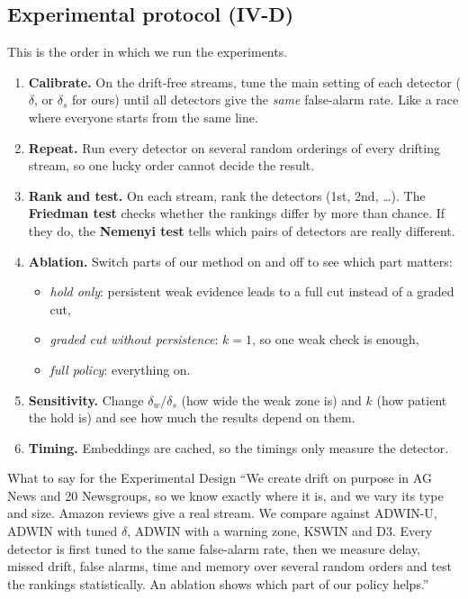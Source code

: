 \documentclass[11pt,a4paper]{article}
\begin{document}
\subsection{Experimental protocol (IV-D)}

This is the order in which we run the experiments.
\begin{enumerate}
\item \textbf{Calibrate.} On the drift-free streams, tune the main setting of each detector ($\delta$, or $\delta_s$ for ours) until all detectors give the \emph{same} false-alarm rate. Like a race where everyone starts from the same line.
\item \textbf{Repeat.} Run every detector on several random orderings of every drifting stream, so one lucky order cannot decide the result.
\item \textbf{Rank and test.} On each stream, rank the detectors (1st, 2nd, \dots). The \textbf{Friedman test} checks whether the rankings differ by more than chance. If they do, the \textbf{Nemenyi test} tells which pairs of detectors are really different.
\item \textbf{Ablation.} Switch parts of our method on and off to see which part matters:
  \begin{itemize}
  \item \emph{hold only}: persistent weak evidence leads to a full cut instead of a graded cut,
  \item \emph{graded cut without persistence}: $k=1$, so one weak check is enough,
  \item \emph{full policy}: everything on.
  \end{itemize}
\item \textbf{Sensitivity.} Change $\delta_w/\delta_s$ (how wide the weak zone is) and $k$ (how patient the hold is) and see how much the results depend on them.
\item \textbf{Timing.} Embeddings are cached, so the timings only measure the detector.
\end{enumerate}

\begin{saybox}{What to say for the Experimental Design}
``We create drift on purpose in AG News and 20 Newsgroups, so we know exactly where it is, and we vary its type and size. Amazon reviews give a real stream. We compare against ADWIN-U, ADWIN with tuned $\delta$, ADWIN with a warning zone, KSWIN and D3. Every detector is first tuned to the same false-alarm rate, then we measure delay, missed drift, false alarms, time and memory over several random orders and test the rankings statistically. An ablation shows which part of our policy helps.''
\end{saybox}
\end{document}

